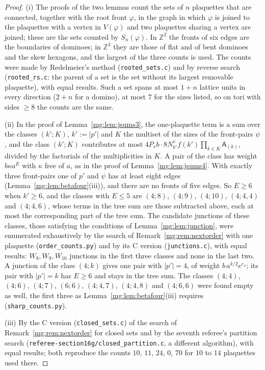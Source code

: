 \documentclass[11pt,a4paper]{article}
\theoremstyle{definition}
\theoremstyle{remark}
\newcommand{\Z}{\mathbb{Z}}
\begin{document}
\begin{proof}
(i) The proofs of the two lemmas count the sets of $n$ plaquettes that are connected, together with the root front $\varphi$, in the graph in which $\varphi$ is joined to the
plaquettes with a vertex in $V(\varphi)$ and two plaquettes sharing a vertex are joined; these are the sets counted by $S_n(\varphi)$. In $\Z^2$ the fronts of six edges are the
boundaries of dominoes; in $\Z^3$ they are those of flat and of bent dominoes and the skew hexagons, and the largest of the three counts is used. The counts were made by
Redelmeier's method (\texttt{rooted\_sets.c}) and by reverse search (\texttt{rooted\_rs.c}: the parent of a set is the set without its largest removable plaquette), with equal
results. Such a set spans at most $1+n$ lattice units in every direction ($2+n$ for a domino), at most $7$ for the sizes listed, so on tori with sides $\ge8$ the counts are the same.

(ii) In the proof of Lemma~\ref{mg:lem:jsums3}, the one-plaquette term is a sum over the classes $(k';K)$, $k':=|p'|$ and $K$ the multiset of the sizes of the front-pairs
$\psi$, and the class $(k';K)$ contributes at most $4P_vb\cdot8N^v_{k'}f(k')\prod_{k\in K}\mathsf A_{(k)}$, divided by the factorials of the multiplicities in $K$. A pair of
the class has weight $b\kappa a^E$ with $\kappa$ free of $a$, as in the proof of Lemma~\ref{mg:lem:jsums4}. With exactly three front-pairs one of $p'$ and $\psi$ has at
least eight edges (Lemma~\ref{mg:lem:betafour}(iii)), and there are no fronts of five edges. So $E\ge6$ when $k'\ge6$, and the classes with $E\le5$ are $(4;8)$, $(4;9)$,
$(4;10)$, $(4;4,4)$ and $(4;4,6)$, whose terms in the tree sum are those subtracted above, each at most the corresponding part of the tree sum. The candidate junctions of
these classes, those satisfying the conditions of Lemma~\ref{mg:lem:junction}, were enumerated exhaustively by the search of Remark~\ref{mg:rem:nextorder} with one plaquette
(\texttt{order\_counts.py}) and by its C version (\texttt{junctions.c}), with equal results: $W_8,W_9,W_{10}$ junctions in the first three classes and none in the last two. A junction of the class $(4;k)$ gives one pair with $|p'|=4$, of weight $b\,a^{k/2}e^{c_J}$; its pair with $|p'|=k$ has
$E\ge6$ and stays in the tree sum. The classes $(4;4)$, $(4;6)$, $(4;7)$, $(6;6)$, $(4;4,7)$, $(4;4,8)$ and $(4;6,6)$ were found empty as well, the first three as
Lemma~\ref{mg:lem:betafour}(iii) requires (\texttt{sharp\_counts.py}).

(iii) By the C version (\texttt{closed\_sets.c}) of the search of Remark~\ref{mg:rem:nextorder} for closed sets and by the seventh referee's partition search
(\texttt{referee-section16g/\allowbreak closed\_partition.c}, a different algorithm), with equal results; both reproduce the counts $10$, $11$, $24$, $0$, $70$ for $10$ to $14$
plaquettes used there.
\end{proof}
\end{document}
